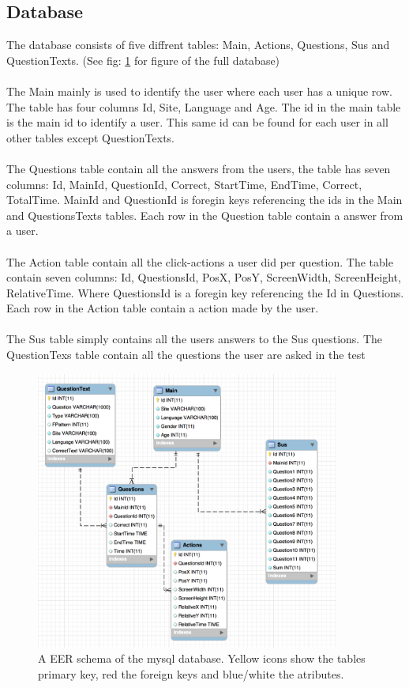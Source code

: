 \subsection{Database}
The database consists of five diffrent tables: Main, Actions, Questions, Sus and QuestionTexts. (See fig: \ref{fig:db_schema} for figure of the full database) 
\\\\
The Main mainly is used to identify the user where each user has a unique row. The table has four columns Id, Site, Language and Age. The id in the main table is the main id to identify a user. This same id can be found for each user in all other tables except QuestionTexts. 
\\\\
The Questions table contain all the answers from the users, the table has seven columns: Id, MainId, QuestionId, Correct, StartTime, EndTime, Correct, TotalTime. MainId and QuestionId is foregin keys referencing the ids in the Main and QuestionsTexts tables.
Each row in the Question table contain a answer from a user.
\\\\
The Action table contain all the click-actions a user did per question. The table contain seven columns: Id, QuestionsId, PosX, PosY, ScreenWidth, ScreenHeight, RelativeTime. Where QuestionsId is a foregin key referencing the Id in Questions. Each row in the Action table contain a action made by the user.
\\\\
The Sus table simply contains all the users answers to the Sus questions. The QuestionTexs table contain all the questions the user are asked in the test

\begin{figure}[h]
	\centering
	\includegraphics[width=100mm]{Images/db_eer.png}
	\decoRule
	\caption[Database Schema]{A EER schema of the mysql database. Yellow icons show the tables primary key, red the foreign keys and blue/white the atributes.}
	\label{fig:db_schema}
\end{figure}

